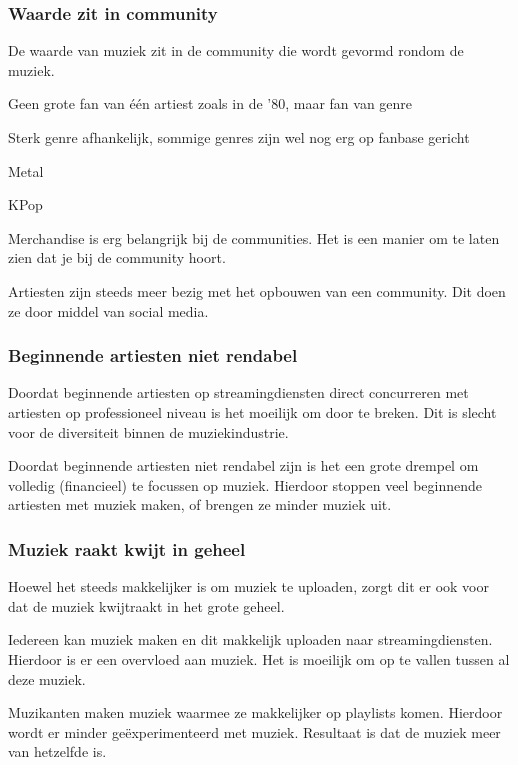 \subsubsection*{Waarde zit in community}
\begin{quotebox}
De waarde van muziek zit in de community die wordt gevormd rondom de muziek.
\end{quotebox}
\begin{todolist}
  \item Geen grote fan van één artiest zoals in de '80, maar fan van genre
  \item Sterk genre afhankelijk, sommige genres zijn wel nog erg op fanbase gericht
  \begin{todolist}
    \item Metal
    \item KPop
  \end{todolist}
  \item Merchandise is erg belangrijk bij de communities. Het is een manier om te laten zien dat je bij de community hoort.
  \item Artiesten zijn steeds meer bezig met het opbouwen van een community. Dit doen ze door middel van social media.
\end{todolist}

\subsubsection*{Beginnende artiesten niet rendabel}
\begin{quotebox}
Doordat beginnende artiesten op streamingdiensten direct concurreren met artiesten op professioneel niveau is het moeilijk om door te breken. Dit is slecht voor de diversiteit binnen de muziekindustrie.
\end{quotebox}
\begin{todolist}
  \item Doordat beginnende artiesten niet rendabel zijn is het een grote drempel om volledig (financieel) te focussen op muziek. Hierdoor stoppen veel beginnende artiesten met muziek maken, of brengen ze minder muziek uit.
\end{todolist}

\subsubsection*{Muziek raakt kwijt in geheel}
\begin{quotebox}
Hoewel het steeds makkelijker is om muziek te uploaden, zorgt dit er ook voor dat de muziek kwijtraakt in het grote geheel.
\end{quotebox}
\begin{todolist}
  \item Iedereen kan muziek maken en dit makkelijk uploaden naar streamingdiensten. Hierdoor is er een overvloed aan muziek. Het is moeilijk om op te vallen tussen al deze muziek.
  \item Muzikanten maken muziek waarmee ze makkelijker op playlists komen. Hierdoor wordt er minder geëxperimenteerd met muziek. Resultaat is dat de muziek meer van hetzelfde is.
\end{todolist}

